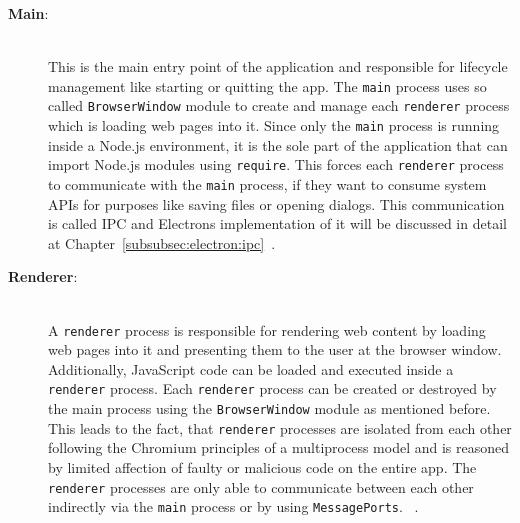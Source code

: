 \begin{description}
    \item[\textbf{Main}:] \hfill \\ This is the main entry point of the application and responsible for lifecycle management like starting or quitting the app.
    The \texttt{main} process uses so called \texttt{BrowserWindow} module to create and manage each \texttt{renderer} process which is loading web pages into it.
    Since only the \texttt{main} process is running inside a Node.js environment, it is the sole part of the application that can import Node.js modules using \texttt{require}.
    This forces each \texttt{renderer} process to communicate with the \texttt{main} process, if they want to consume system \ac{API}s for purposes like saving files or opening dialogs.
    This communication is called \ac{IPC} and Electrons implementation of it will be discussed in detail at Chapter~\ref{subsubsec:electron:ipc}~\cite{ElectronDoc,electron-in-action}.

    \newpage
    \item[\textbf{Renderer}:] \hfill \\ A \texttt{renderer} process is responsible for rendering web content by loading web pages into it and presenting them to the user at the browser window.
    Additionally, JavaScript code can be loaded and executed inside a \texttt{renderer} process.
    Each \texttt{renderer} process can be created or destroyed by the main process using the \texttt{BrowserWindow} module as mentioned before.
    This leads to the fact, that \texttt{renderer} processes are isolated from each other following the Chromium principles of a multiprocess model and is reasoned by limited affection of
    faulty or malicious code on the entire app.
    The \texttt{renderer} processes are only able to communicate between each other indirectly via the \texttt{main} process or by using \texttt{MessagePorts}.
    ~\cite{ElectronDoc,electron-in-action}.
\end{description}

